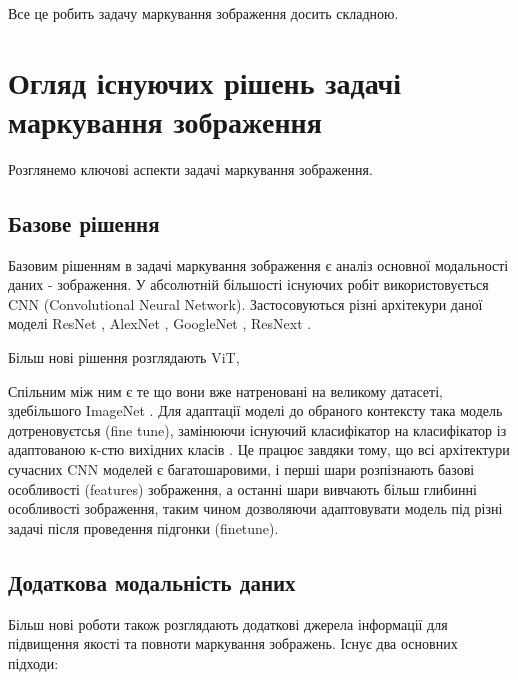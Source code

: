 \documentclass{udstu}
\begin{document}
Все це робить задачу маркування зображення досить складною.


\chapter{Огляд існуючих рішень задачі маркування зображення}

Розглянемо ключові аспекти задачі маркування зображення.

\section{Базове рішення}

Базовим рішенням в задачі маркування зображення є аналіз основної модальності даних - зображення.
У абсолютній більшості існуючих робіт використовується CNN (Convolutional Neural Network).
Застосовуються різні архітекури даної моделі ResNet \cite{resnet}, AlexNet \cite{alexnet},
GoogleNet \cite{googlenet}, ResNext \cite{resnext}.

Більш нові рішення розглядають ViT,

Спільним між ним є те що вони вже натреновані на великому датасеті, здебільшого ImageNet \cite{deng2009imagenet}.
Для адаптації моделі до обраного контексту така модель дотреновуєтсья (fine tune), замінюючи існуючий класифікатор
на класифікатор із адаптованою к-стю вихідних класів \cite{cnn-labeling}.
Це працює завдяки тому, що всі архітектури сучасних CNN моделей є багатошаровими,
і перші шари розпізнають базові особливості (features) зображення, а
останні шари вивчають більш глибинні особливості зображення,
таким чином дозволяючи адаптовувати модель під різні задачі після проведення підгонки (finetune).




\section{Додаткова модальність даних}

Більш нові роботи також розглядають додаткові джерела інформації для підвищення якості та повноти
маркування зображень. Існує два основних підходи:
\end{document}

